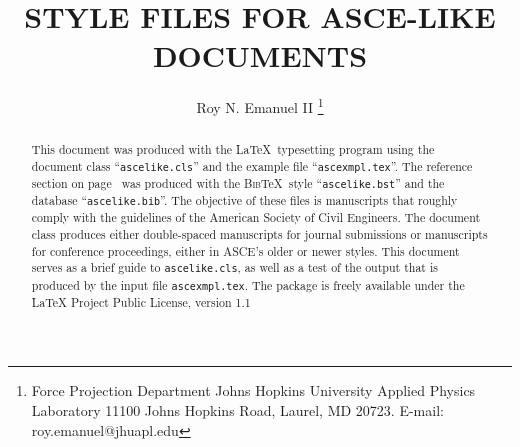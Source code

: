 \documentclass[Proceedings]{ascelike}
\begin{document}
%
\title{STYLE FILES FOR ASCE-LIKE DOCUMENTS}
%
\author{
Roy N. Emanuel II%
%
\thanks{
Force Projection Department
Johns Hopkins University Applied Physics Laboratory
11100 Johns Hopkins Road, 
Laurel, MD 20723. E-mail: roy.emanuel@jhuapl.edu}
%
%
%
%
%
%
}
%
\maketitle
%
\begin{abstract}
This document was produced with the \LaTeX\ typesetting program
using the document class ``\texttt{ascelike.cls}'' and the
example file ``\texttt{ascexmpl.tex}''.
The reference section on page~\pageref{section:references}
was produced with the \textsc{Bib}\TeX\ style ``\texttt{ascelike.bst}''
and the database ``\texttt{ascelike.bib}''.
The objective of these files is manuscripts that roughly comply with the
guidelines of the American Society of Civil Engineers.
The document class
produces either double-spaced manuscripts for journal submissions or
manuscripts for conference proceedings, either in ASCE's older or newer
styles.
This document serves as a brief guide to \texttt{ascelike.cls},
as well as a test of the output that is produced
by the input file \texttt{ascexmpl.tex}.
The package is freely available under the LaTeX 
Project Public License, version 1.1
\end{abstract}
%
%
%
\end{document}
